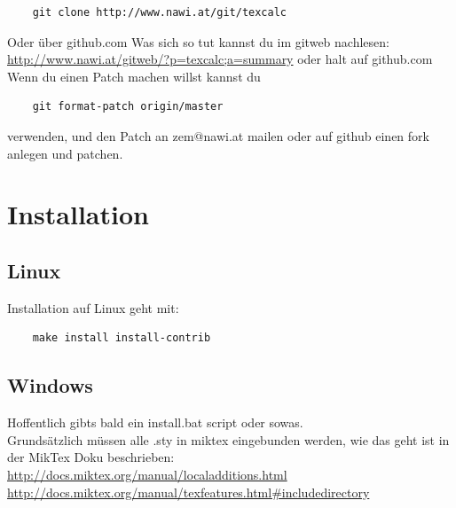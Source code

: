 \documentclass[a4paper]{article}
\begin{document}
\begin{verbatim}
	git clone http://www.nawi.at/git/texcalc
\end{verbatim}

Oder über github.com Was sich so tut kannst du im gitweb nachlesen: 
\url{http://www.nawi.at/gitweb/?p=texcalc;a=summary} oder halt auf github.com\\

Wenn du einen Patch machen willst kannst du 

\begin{verbatim}
	git format-patch origin/master
\end{verbatim}

verwenden, und den Patch an zem@nawi.at mailen oder auf github einen fork 
anlegen und patchen. 


\section{Installation}

\subsection{Linux}

Installation auf Linux geht mit: 

\begin{verbatim}
	make install install-contrib
\end{verbatim}

\subsection{Windows}

Hoffentlich gibts bald ein install.bat script oder sowas. \\

Grundsätzlich müssen alle .sty in miktex eingebunden werden, wie das 
geht ist in der MikTex Doku beschrieben:\\

\url{http://docs.miktex.org/manual/localadditions.html}\\
\url{http://docs.miktex.org/manual/texfeatures.html#includedirectory}\\

%
%
\end{document}
